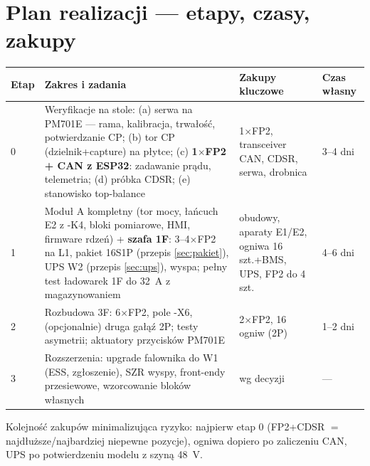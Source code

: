 \documentclass[11pt,a4paper]{article}
\begin{document}
\section{Plan realizacji --- etapy, czasy, zakupy}
\label{sec:plan}
\begin{longtable}{@{}p{}p{}p{}p{}@{}}
\toprule
\textbf{Etap} & \textbf{Zakres i zadania} & \textbf{Zakupy kluczowe} & \textbf{Czas własny}\\
\midrule
0 & Weryfikacje na stole: (a) serwa na PM701E --- rama, kalibracja, trwałość, potwierdzanie CP;
(b) tor CP (dzielnik+capture) na płytce; (c) \textbf{1$\times$FP2 + CAN z ESP32}: zadawanie prądu,
telemetria; (d) próbka CDSR; (e) stanowisko top-balance & 1$\times$FP2, transceiver CAN, CDSR,
serwa, drobnica & 3--4 dni\\
1 & Moduł A kompletny (tor mocy, łańcuch E2 z -K4, bloki pomiarowe, HMI, firmware rdzeń) +
\textbf{szafa 1F}: 3--4$\times$FP2 na L1, pakiet 16S1P (przepis \ref{sec:pakiet}), UPS W2
(przepis \ref{sec:ups}), wyspa; pełny test ładowarek 1F do 32~A z magazynowaniem & obudowy,
aparaty E1/E2, ogniwa 16 szt.+BMS, UPS, FP2 do 4 szt. & 4--6 dni\\
2 & Rozbudowa 3F: 6$\times$FP2, pole -X6, (opcjonalnie) druga gałąź 2P; testy asymetrii;
aktuatory przycisków PM701E & 2$\times$FP2, 16 ogniw (2P) & 1--2 dni\\
3 & Rozszerzenia: upgrade falownika do W1 (ESS, zgłoszenie), SZR wyspy, front-endy przesiewowe,
wzorcowanie bloków własnych & wg decyzji & ---\\
\bottomrule
\end{longtable}
Kolejność zakupów minimalizująca ryzyko: najpierw etap 0 (FP2+CDSR $=$ najdłuższe/najbardziej
niepewne pozycje), ogniwa dopiero po zaliczeniu CAN, UPS po potwierdzeniu modelu z szyną 48~V.
\end{document}
